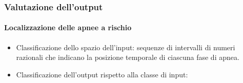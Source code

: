 \begin{frame}
  \frametitle{Valutazione dell'output}
  \framesubtitle{Localizzazione delle apnee a rischio}
% 
% 
\begin{itemize}
  \item 
    Classificazione dello spazio dell'input: sequenze di intervalli di numeri razionali che indicano la posizione temporale di ciascuna fase di apnea.
  \item
    Classificazione dell'output rispetto alla classe di input:
% 
% 

\end{itemize}
\end{frame}

